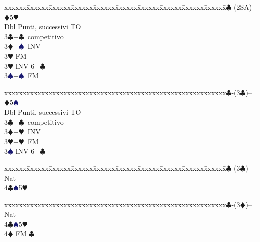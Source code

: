 \documentclass[a4paper,italian]{article}
\newcommand{\BC}{\textcolor{OliveGreen}{$\clubsuit$}}
\newcommand{\BD}{\textcolor{RedOrange}{$\vardiamondsuit$}}
\newcommand{\BH}{\textcolor{Red2}{$\varheartsuit${}}}
\newcommand{\BS}{\textcolor{MidnightBlue}{$\spadesuit${}}}
\newenvironment{bidtable}
{\begin{tabbing}

    xxxxxx\=xxxxxx\=xxxxxx\=xxxxxx\=xxxxxx\=xxxxxx\=xxxxxx\=xxxxxx\=xxxxxx\=xxxxxx\=\kill}
{\end{tabbing} }%
\begin{document}
\begin{multicols}{2}
\begin{bidtable}
                                            1\BC-(2SA)-- \> \BD 5\BH \+\\
                                            Dbl \> Punti, successivi TO\\
                                            3\BC {}+\BC\ competitivo\\
                                            3\BD {}+\BS\ INV\+\\
                                            3\BH \> FM\-\\
                                            3\BH \> INV 6+\BC \\
                                            3\BS {}+\BS\ FM\-
                                        \end{bidtable}
                                        \begin{bidtable}
                                            1\BC-(3\BC)-- \> \BD 5\BS \+\\
                                            Dbl \> Punti, successivi TO\\
                                            3\BC {}+\BC\ competitivo\\
                                            3\BD {}+\BH\ INV\\
                                            3\BH {}+\BH\ FM\\
                                            3\BS \> INV 6+\BC \-
                                        \end{bidtable}
                                        \begin{bidtable}
                                            1\BC-(3\BC)-- \> \> Nat\+\\
                                            4\BC {}\BS 5\BH \-
                                        \end{bidtable}
                                        \begin{bidtable}
                                            1\BC-(3\BD)-- \> \> Nat\+\\
                                            4\BC {}\BS 5\BH \\
                                            4\BD \> FM \BC \-
                                        \end{bidtable}


\end{multicols}
\end{document}
